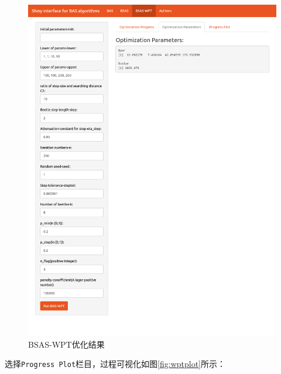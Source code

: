 \documentclass[]{ctexbook}
\theoremstyle{definition}
\theoremstyle{definition}
\theoremstyle{definition}
\theoremstyle{remark}
\begin{document}
\begin{figure}

{\centering \includegraphics[width=0.95\linewidth]{img/wpt2} 

}

\caption{BSAS-WPT优化结果}\label{fig:wptparms}
\end{figure}

选择\texttt{Progress\ Plot}栏目，过程可视化如图\ref{fig:wptplot}所示：
\end{document}
